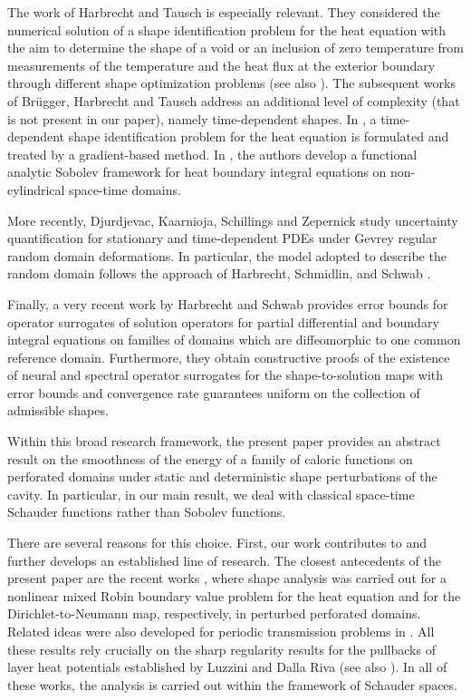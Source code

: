 \documentclass[11pt,reqno,a4paper]{amsart}
\theoremstyle{plain}
\theoremstyle{definition}
\begin{document}
The work of Harbrecht and Tausch \cite{HaTa2013} is especially relevant. They considered the numerical solution of a shape identification problem for the heat equation with the aim to determine the shape of a void or an inclusion of zero temperature from measurements of the temperature and the heat flux at the exterior boundary through different shape optimization problems (see also \cite{HaTa2011}).
The subsequent works of Br\"ugger, Harbrecht and Tausch \cite{BrHaTa2021,BrHaTa2022} address an additional level of complexity (that is not present in our paper), namely time-dependent shapes. In \cite{BrHaTa2021}, a time-dependent shape identification problem for the heat equation is formulated and treated by a gradient-based method. In \cite{BrHaTa2022}, the authors develop a functional analytic Sobolev framework for heat boundary integral equations on non-cylindrical space-time domains. 

More recently, Djurdjevac, Kaarnioja, Schillings and Zepernick \cite{DjKaScZe2026} study uncertainty quantification for stationary and time-dependent PDEs under Gevrey regular random domain deformations. In particular, the model adopted to describe the random domain follows the approach of Harbrecht, Schmidlin, and Schwab \cite{HaScSc2024}. 

Finally, a very recent work by Harbrecht and Schwab \cite{HaSc2026} provides error bounds for operator surrogates of solution operators for partial differential and boundary integral equations on families of
domains which are diffeomorphic to one common reference domain. Furthermore, they obtain constructive proofs of the existence of neural and spectral operator surrogates for the shape-to-solution maps with error bounds and convergence rate guarantees uniform on the collection of admissible shapes.

Within this broad research framework, the present paper provides an abstract result on the smoothness of the energy of a family of caloric functions on perforated domains under static and deterministic shape perturbations of the cavity. In particular, in our main result, we deal with classical space-time Schauder functions rather than Sobolev functions. 

There are several reasons for this choice. First, our work contributes to and further develops an established line of research. The closest antecedents of the present paper are the recent works \cite{DaLuMoMu24.2,DaLuMu25}, where shape analysis was carried out for a nonlinear mixed Robin boundary value problem for the heat equation and for the Dirichlet-to-Neumann map, respectively, in perturbed perforated domains. Related ideas were also developed for periodic transmission problems in \cite{Lu20,DaLuMoMu24}. All these results rely crucially on the sharp regularity results for the pullbacks of layer heat potentials established by Luzzini and Dalla Riva \cite{DaLu23} (see also \cite{LaLu17,LaLu19}). In all of these works, the analysis is carried out within the framework of Schauder spaces.
\end{document}
